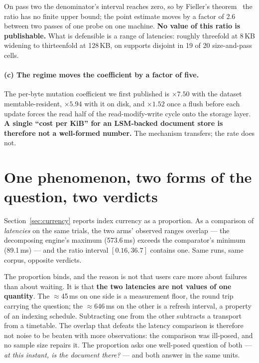 \documentclass[11pt,a4paper]{article}
\begin{document}
On pass two the denominator's interval reaches zero, so by Fieller's theorem~\cite{fieller1954ratio}
the ratio has no finite upper bound; the
point estimate moves by a factor of 2.6 between two passes of one probe on one machine.
\textbf{No value of this ratio is publishable.} What is defensible is a range of latencies:
roughly threefold at 8\,KB widening to thirteenfold at 128\,KB, on supports disjoint in 19 of 20
size-and-pass cells.

\paragraph{(c) The regime moves the coefficient by a factor of five.} The per-byte mutation
coefficient we first published is $\times 7.50$ with the dataset memtable-resident, $\times 5.94$
with it on disk, and $\times 1.52$ once a flush before each update forces the read half of the
read-modify-write cycle onto the storage layer. \textbf{A single ``cost per KiB'' for an LSM-backed
document store is therefore not a well-formed number.} The mechanism transfers; the rate does not.

\section{One phenomenon, two forms of the question, two verdicts}
\label{sec:forms}

Section~\ref{sec:currency} reports index currency as a proportion. As a comparison of
\emph{latencies} on the same trials, the two arms' observed ranges overlap --- the decomposing
engine's maximum (573.6\,ms) exceeds the comparator's minimum (89.1\,ms) --- and the ratio interval
$[0.16, 36.7]$ contains one. Same runs, same corpus, opposite verdicts.

The proportion binds, and the reason is not that users care more about failures than about waiting.
It is that \textbf{the two latencies are not values of one quantity}. The $\approx$45\,ms on one
side is a measurement floor, the round trip carrying the question; the $\approx$646\,ms on the other
is a refresh interval, a property of an indexing schedule. Subtracting one from the other subtracts
a transport from a timetable. The overlap that defeats the latency comparison is therefore not noise
to be beaten with more observations: the comparison was ill-posed, and no sample size repairs it.
The proportion asks one well-posed question of both --- \emph{at this instant, is the document
there?} --- and both answer in the same units.
\end{document}
